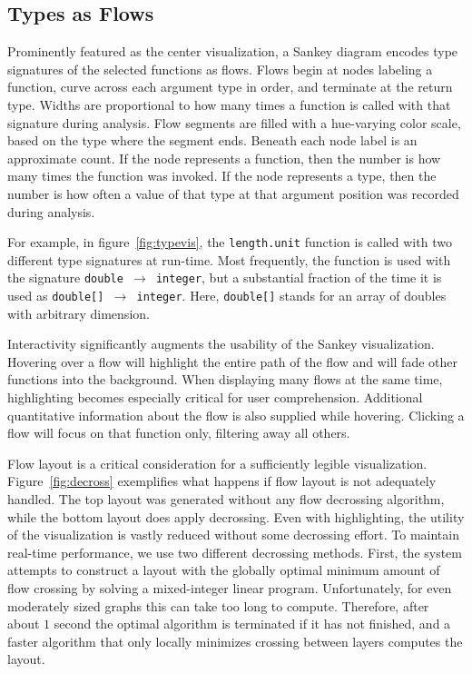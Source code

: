 \documentclass{vgtc}                          %
\begin{document}
\subsection{Types as Flows}

Prominently featured as the center visualization,
a Sankey diagram encodes type signatures of the selected
functions as flows.
Flows begin at nodes labeling a function,
curve across each argument type in order,
and terminate at the return type.
Widths are proportional to how many times a function
is called with that signature during analysis.
Flow segments are filled with a hue-varying color scale,
based on the type where the segment ends.
Beneath each node label is an approximate count.
If the node represents a function, then the
number is how many times the function was invoked.
If the node represents a type, then the
number is how often a value of that type
at that argument position was recorded during analysis.

For example, in figure~\ref{fig:typevis},
the {\tt length.unit} function is called with
two different type signatures at run-time.
Most frequently, the function is used with the
signature {\tt double $\to$ integer},
but a substantial fraction of the time it is
used as {\tt double[] $\to$ integer}.
Here, {\tt double[]} stands for an array of
doubles with arbitrary dimension.

Interactivity significantly augments the
usability of the Sankey visualization.
Hovering over a flow will highlight the
entire path of the flow
and will fade other functions
into the background.
When displaying many flows at the same time,
highlighting becomes especially critical
for user comprehension.
Additional quantitative information
about the flow is also supplied
while hovering.
Clicking a flow will focus on that function
only, filtering away all others.

Flow layout is a critical consideration
for a sufficiently legible visualization.
Figure~\ref{fig:decross} exemplifies what
happens if flow layout is not adequately handled.
The top layout was generated without any
flow decrossing algorithm,
while the bottom layout does
apply decrossing.
Even with highlighting,
the utility of the visualization is vastly
reduced without some decrossing effort.
To maintain real-time performance,
we use two different decrossing methods.
First, the system attempts to construct
a layout with the globally optimal
minimum amount of flow crossing by
solving a mixed-integer linear program.
Unfortunately, for even moderately
sized graphs this can take too long to compute.
Therefore, after about $1$ second
the optimal algorithm is terminated
if it has not finished, and a faster
algorithm that only locally minimizes crossing
between layers computes the layout.
\end{document}
